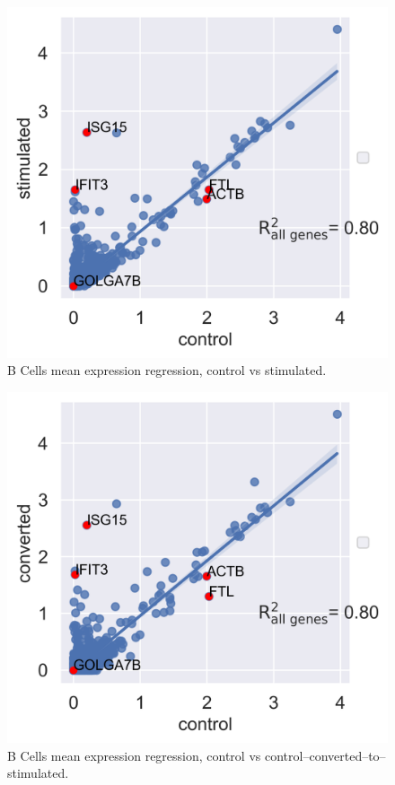 \documentclass[11pt, a4paper]{report}
\theoremstyle{plain}
\theoremstyle{definition}
\theoremstyle{remark}
\begin{document}
\begin{figure}[h]
\centering
\includegraphics[width=1.1\textwidth]{images/Kang_bcells_ctrl_stim.png}
\caption{
B Cells mean expression regression, control vs stimulated.
}
\label{fig:Kang_bcells_ctrl_stim}
\end{figure}

\begin{figure}[h]
\centering
\includegraphics[width=1.1\textwidth]{images/Kang_bcells_ctrl_converted.png}
\caption{
B Cells mean expression regression, control vs
control--converted--to--stimulated.
}
\label{fig:Kang_bcells_ctrl_converted}
\end{figure}
\end{document}
